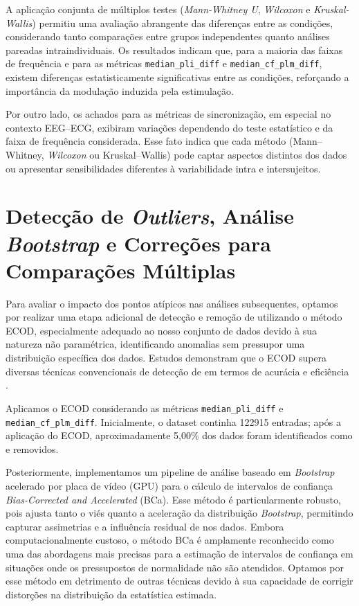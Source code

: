 A aplicação conjunta de múltiplos testes (\textit{Mann-Whitney U}, \textit{Wilcoxon} e \textit{Kruskal-Wallis}) permitiu uma avaliação abrangente das diferenças entre as condições, considerando tanto comparações entre grupos independentes quanto análises pareadas intraindividuais. Os resultados indicam que, para a maioria das faixas de frequência e para as métricas \texttt{median\_pli\_diff} e \texttt{median\_cf\_plm\_diff}, existem diferenças estatisticamente significativas entre as condições, reforçando a importância da modulação induzida pela estimulação.

Por outro lado, os achados para as métricas de sincronização, em especial no contexto EEG–ECG, exibiram variações dependendo do teste estatístico e da faixa de frequência considerada. Esse fato indica que cada método (Mann–Whitney, \textit{Wilcoxon} ou Kruskal–Wallis) pode captar aspectos distintos dos dados ou apresentar sensibilidades diferentes à variabilidade intra e intersujeitos.

\section{Detecção de \textit{Outliers}, Análise \textit{Bootstrap} e Correções para Comparações Múltiplas}
Para avaliar o impacto dos pontos atípicos nas análises subsequentes, optamos por realizar uma etapa adicional de detecção e remoção de  utilizando o método ECOD, especialmente adequado ao nosso conjunto de dados devido à sua natureza não paramétrica, identificando anomalias sem pressupor uma distribuição específica dos dados. Estudos demonstram que o ECOD supera diversas técnicas convencionais de detecção de  em termos de acurácia e eficiência \cite{li2022ecod}.

Aplicamos o ECOD considerando as métricas \texttt{median\_pli\_diff} e \texttt{median\_cf\_plm\_diff}. Inicialmente, o dataset continha 122915 entradas; após a aplicação do ECOD, aproximadamente 5,00\% dos dados foram identificados como  e removidos.

Posteriormente, implementamos um pipeline de análise baseado em \textit{Bootstrap} acelerado por placa de vídeo (GPU) para o cálculo de intervalos de confiança \textit{Bias-Corrected and Accelerated} (BCa). Esse método é particularmente robusto, pois ajusta tanto o viés quanto a aceleração da distribuição \textit{Bootstrap}, permitindo capturar assimetrias e a influência residual de  nos dados. Embora computacionalmente custoso, o método BCa é amplamente reconhecido como uma das abordagens mais precisas para a estimação de intervalos de confiança em situações onde os pressupostos de normalidade não são atendidos. Optamos por esse método em detrimento de outras técnicas devido à sua capacidade de corrigir distorções na distribuição da estatística estimada.

